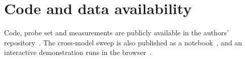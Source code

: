 \documentclass[10pt,conference]{IEEEtran}
\begin{document}
\section*{Code and data availability}
Code, probe set and measurements are publicly available in the authors' repository~\cite{thakur2026code}. The cross-model sweep is also published as a notebook~\cite{thakur2026notebook}, and an interactive demonstration runs in the browser~\cite{thakur2026demo}.


\ifanonymous
  
\else
  
\fi
\end{document}
